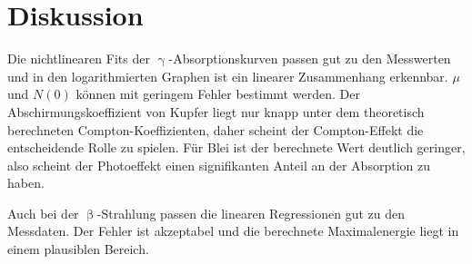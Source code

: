 \section{Diskussion}
\label{sec:Diskussion}

Die nichtlinearen Fits der $\upgamma$-Absorptionskurven passen gut zu den Messwerten und in den logarithmierten Graphen ist ein linearer Zusammenhang erkennbar. $\mu$ und $N(0)$ können mit geringem Fehler bestimmt werden. Der Abschirmungskoeffizient von Kupfer liegt nur knapp unter dem theoretisch berechneten Compton-Koeffizienten, daher scheint der Compton-Effekt die entscheidende Rolle zu spielen. Für Blei ist der berechnete Wert deutlich geringer, also scheint der Photoeffekt einen signifikanten Anteil an der Absorption zu haben.

Auch bei der $\upbeta$-Strahlung passen die linearen Regressionen gut zu den Messdaten. Der Fehler ist akzeptabel und die berechnete Maximalenergie liegt in einem plausiblen Bereich.
